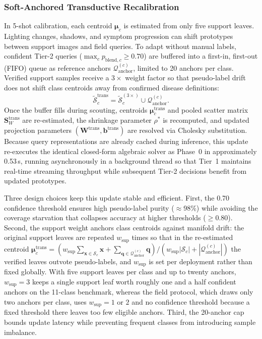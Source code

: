 \subsubsection{Soft-Anchored Transductive Recalibration}
\label{sec:transductive}
In 5-shot calibration, each centroid $\boldsymbol{\mu}_c$ is estimated from only five support leaves. Lighting changes, shadows, and symptom progression can shift prototypes between support images and field queries. To adapt without manual labels, confident Tier-2 queries ($\max_c p_{\text{blend}, c} \ge 0.70$) are buffered into a first-in, first-out (FIFO) queue as reference anchors $\mathcal{Q}_{\text{anchor}}^{(c)}$, limited to 20 anchors per class. Verified support samples receive a $3\times$ weight factor so that pseudo-label drift does not shift class centroids away from confirmed disease definitions:
\begin{equation}
    \label{eq:transductive_set}
    \tilde{\mathcal{S}}_c^{\text{trans}} = \tilde{\mathcal{S}}_c^{(3\times)} \cup \mathcal{Q}_{\text{anchor}}^{(c)}.
\end{equation}
Once the buffer fills during scouting, centroids $\boldsymbol{\mu}_c^{\text{trans}}$ and pooled scatter matrix $\mathbf{S}_W^{\text{trans}}$ are re-estimated, the shrinkage parameter $\rho^*$ is recomputed, and updated projection parameters $(\mathbf{W}^{\text{trans}}, \mathbf{b}^{\text{trans}})$ are resolved via Cholesky substitution. Because query representations are already cached during inference, this update re-executes the identical closed-form algebraic solver as Phase~0 in approximately 0.53\,s, running asynchronously in a background thread so that Tier~1 maintains real-time streaming throughput while subsequent Tier-2 decisions benefit from updated prototypes.

Three design choices keep this update stable and efficient. First, the 0.70 confidence threshold ensures high pseudo-label purity ($\approx$98\%) while avoiding the coverage starvation that collapses accuracy at higher thresholds ($\ge$0.80). Second, the support weight anchors class centroids against manifold drift: the original support leaves are repeated $w_{\mathrm{sup}}$ times so that in the re-estimated centroid
$\boldsymbol{\mu}_c^{\text{trans}} = (w_{\mathrm{sup}}\sum_{\mathbf{x}\in\mathcal{S}_c}\mathbf{x} + \sum_{\mathbf{q}\in\mathcal{Q}_{\text{anchor}}^{(c)}}\mathbf{q}) / (w_{\mathrm{sup}}|\mathcal{S}_c| + |\mathcal{Q}_{\text{anchor}}^{(c)}|)$
the verified leaves outvote pseudo-labels, and $w_{\mathrm{sup}}$ is set per deployment rather than fixed globally. With five support leaves per class and up to twenty anchors, $w_{\mathrm{sup}}=3$ keeps a single support leaf worth roughly one and a half confident anchors on the 11-class benchmark, whereas the field protocol, which draws only two anchors per class, uses $w_{\mathrm{sup}}=1$ or $2$ and no confidence threshold because a fixed threshold there leaves too few eligible anchors. Third, the 20-anchor cap bounds update latency while preventing frequent classes from introducing sample imbalance.

